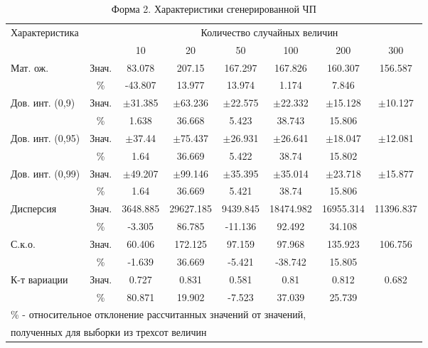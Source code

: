 \documentclass{article}
\begin{document}
\begin{table}[H]
    \centering
    \caption{Форма 2. Характеристики сгенерированной ЧП}
    \begin{tabular}{|l|c|c|c|c|c|c|c|}
    \hline
    \multirow{2}{*}{Характеристика}& & \multicolumn{6}{c|}{Количество случайных величин} \\
    \cline{3-8}
    & & 10 & 20 & 50 & 100 & 200 & 300 \\
    \hline
    Мат. ож. & Знач. & 83.078& 207.15& 167.297& 167.826& 160.307& 156.587 \\
     & \%            & -43.807& 13.977& 13.974& 1.174& 7.846 &\\ 
    \hline
    Дов. инт. (0,9) & Знач.& $\pm$31.385 & $\pm$63.236 & $\pm$22.575 & $\pm$22.332 & $\pm$15.128 & $\pm$10.127 \\
     & \%                  & 1.638& 36.668& 5.423& 38.743& 15.806& \\
    \hline
    Дов. инт. (0,95) & Знач.& $\pm$37.44 & $\pm$75.437 & $\pm$26.931 & $\pm$26.641 & $\pm$18.047 & $\pm$12.081 \\
     & \%                   & 1.64& 36.669& 5.422& 38.74& 15.802 & \\
    \hline
    Дов. инт. (0,99) & Знач.& $\pm$49.207 & $\pm$99.146 & $\pm$35.395 & $\pm$35.014 & $\pm$23.718 & $\pm$15.877 \\
     & \%                   & 1.64& 36.669& 5.421& 38.74& 15.806&\\
    \hline
    Дисперсия & Знач. & 3648.885 & 29627.185 & 9439.845 & 18474.982 & 16955.314 & 11396.837\\
     & \%             & -3.305& 86.785& -11.136& 92.492& 34.108  &\\
    \hline
    С.к.о. & Знач. & 60.406 & 172.125 & 97.159 & 97.968 & 135.923 & 106.756\\
     & \%          & -1.639& 36.669& -5.421& -38.742& 15.805 &\\
    \hline
    К-т вариации & Знач. & 0.727 & 0.831 & 0.581 & 0.81 & 0.812 & 0.682\\
     & \%                & 80.871& 19.902& -7.523& 37.039& 25.739 &\\
    \hline
    \multicolumn{7}{l}{\footnotesize \% - относительное отклонение рассчитанных значений от значений,}\\
    \multicolumn{7}{l}{\footnotesize полученных для выборки из трехсот величин}
    \end{tabular}
    \end{table}
\end{document}
